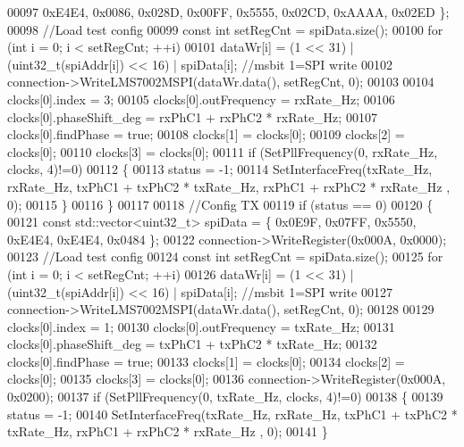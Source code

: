 \begin{DoxyCode}
00097                  0xE4E4, 0x0086, 0x028D, 0x00FF, 0x5555, 0x02CD, 0xAAAA, 0x02ED \};
00098         \textcolor{comment}{//Load test config}
00099         \textcolor{keyword}{const} \textcolor{keywordtype}{int} setRegCnt = spiData.size();
00100         \textcolor{keywordflow}{for} (\textcolor{keywordtype}{int} i = 0; i < setRegCnt; ++i)
00101             dataWr[i] = (1 << 31) | (uint32\_t(spiAddr[i]) << 16) | spiData[i]; \textcolor{comment}{//msbit 1=SPI write}
00102         connection->WriteLMS7002MSPI(dataWr.data(), setRegCnt, 0);
00103 
00104         clocks[0].index = 3;
00105         clocks[0].outFrequency = rxRate\_Hz;
00106         clocks[0].phaseShift_deg = rxPhC1 + rxPhC2 * rxRate\_Hz;
00107         clocks[0].findPhase = \textcolor{keyword}{true};
00108         clocks[1] = clocks[0];
00109         clocks[2] = clocks[0];
00110         clocks[3] = clocks[0];
00111         \textcolor{keywordflow}{if} (SetPllFrequency(0, rxRate\_Hz, clocks, 4)!=0)
00112         \{
00113             status = -1;
00114             SetInterfaceFreq(txRate\_Hz, rxRate\_Hz, txPhC1 + txPhC2 * txRate\_Hz, rxPhC1 + rxPhC2 * rxRate\_Hz
      , 0);
00115         \}
00116     \}
00117 
00118     \textcolor{comment}{//Config TX}
00119     \textcolor{keywordflow}{if} (status == 0)
00120     \{
00121         \textcolor{keyword}{const} std::vector<uint32\_t> spiData = \{ 0x0E9F, 0x07FF, 0x5550, 0xE4E4, 0xE4E4, 0x0484 \};
00122         connection->WriteRegister(0x000A, 0x0000);
00123         \textcolor{comment}{//Load test config}
00124         \textcolor{keyword}{const} \textcolor{keywordtype}{int} setRegCnt = spiData.size();
00125         \textcolor{keywordflow}{for} (\textcolor{keywordtype}{int} i = 0; i < setRegCnt; ++i)
00126             dataWr[i] = (1 << 31) | (uint32\_t(spiAddr[i]) << 16) | spiData[i]; \textcolor{comment}{//msbit 1=SPI write}
00127                 connection->WriteLMS7002MSPI(dataWr.data(), setRegCnt, 0);
00128 
00129         clocks[0].index = 1;
00130         clocks[0].outFrequency = txRate\_Hz;
00131         clocks[0].phaseShift_deg = txPhC1 + txPhC2 * txRate\_Hz;
00132         clocks[0].findPhase = \textcolor{keyword}{true};
00133         clocks[1] = clocks[0];
00134         clocks[2] = clocks[0];
00135         clocks[3] = clocks[0];
00136         connection->WriteRegister(0x000A, 0x0200);
00137         \textcolor{keywordflow}{if} (SetPllFrequency(0, txRate\_Hz, clocks, 4)!=0)
00138         \{
00139             status = -1;
00140             SetInterfaceFreq(txRate\_Hz, rxRate\_Hz, txPhC1 + txPhC2 * txRate\_Hz, rxPhC1 + rxPhC2 * rxRate\_Hz
      , 0);
00141         \}

\end{DoxyCode}
